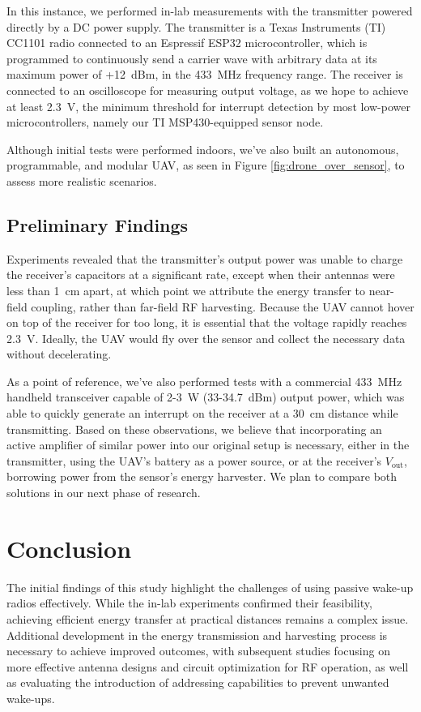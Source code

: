 \documentclass[conference]{IEEEtran}
\begin{document}
In this instance, we performed in-lab measurements with the transmitter powered directly by a DC power supply. The transmitter is a Texas Instruments (TI) CC1101 radio connected to an Espressif ESP32 microcontroller, which is programmed to continuously send a carrier wave with arbitrary data at its maximum power of +12~dBm, in the 433~MHz frequency range. The receiver is connected to an oscilloscope for measuring output voltage, as we hope to achieve at least 2.3~V, the minimum threshold for interrupt detection by most low-power microcontrollers, namely our TI MSP430-equipped sensor node.

Although initial tests were performed indoors, we've also built an autonomous, programmable, and modular UAV, as seen in Figure \ref{fig:drone_over_sensor}, to assess more realistic scenarios.

\subsection{Preliminary Findings}

Experiments revealed that the transmitter's output power was unable to charge the receiver's capacitors at a significant rate, except when their antennas were less than 1~cm apart, at which point we attribute the energy transfer to near-field coupling, rather than far-field RF harvesting. Because the UAV cannot hover on top of the receiver for too long, it is essential that the voltage rapidly reaches 2.3~V. Ideally, the UAV would fly over the sensor and collect the necessary data without decelerating.

As a point of reference, we've also performed tests with a commercial 433~MHz handheld transceiver capable of 2-3~W (33-34.7~dBm) output power, which was able to quickly generate an interrupt on the receiver at a 30~cm distance while transmitting. Based on these observations, we believe that incorporating an active amplifier of similar power into our original setup is necessary, either in the transmitter, using the UAV's battery as a power source, or at the receiver's $V_{\text{out}}$, borrowing power from the sensor's energy harvester. We plan to compare both solutions in our next phase of research.

\section{Conclusion}

The initial findings of this study highlight the challenges of using passive wake-up radios effectively. While the in-lab experiments confirmed their feasibility, achieving efficient energy transfer at practical distances remains a complex issue. Additional development in the energy transmission and harvesting process is necessary to achieve improved outcomes, with subsequent studies focusing on more effective antenna designs and circuit optimization for RF operation, as well as evaluating the introduction of addressing capabilities to prevent unwanted wake-ups.
\end{document}
